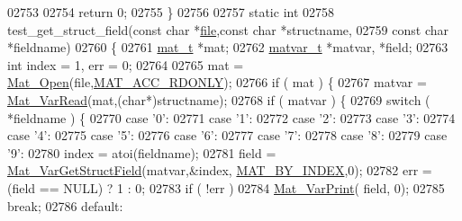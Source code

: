 \begin{DoxyCode}
{{{{{{{{02753 
02754     \textcolor{keywordflow}{return} 0;
02755 \}
02756 
02757 \textcolor{keyword}{static} \textcolor{keywordtype}{int}
02758 test\_get\_struct\_field(\textcolor{keyword}{const} \textcolor{keywordtype}{char} *\hyperlink{structfile}{file},\textcolor{keyword}{const} \textcolor{keywordtype}{char} *structname,
02759     \textcolor{keyword}{const} \textcolor{keywordtype}{char} *fieldname)
02760 \{
02761     \hyperlink{struct__mat__t}{mat\_t} *mat;
02762     \hyperlink{group___m_a_t_structmatvar__t}{matvar\_t} *matvar, *field;
02763     \textcolor{keywordtype}{int} index = 1, err = 0;
02764 
02765     mat = \hyperlink{group___m_a_t_gafbfedb5636a99f0ef867520c47f77d18}{Mat\_Open}(file,\hyperlink{group___m_a_t_ggaa9dcbc70f538af79bd557593ff6b5cdba8dd1457651b27ba9bea6cfba158c037c}{MAT\_ACC\_RDONLY});
02766     \textcolor{keywordflow}{if} ( mat ) \{
02767         matvar = \hyperlink{group___m_a_t_ga3505f63029763eaa73d5a19f1115eb42}{Mat\_VarRead}(mat,(\textcolor{keywordtype}{char}*)structname);
02768         \textcolor{keywordflow}{if} ( matvar ) \{
02769             \textcolor{keywordflow}{switch} ( *fieldname ) \{
02770                 \textcolor{keywordflow}{case} \textcolor{charliteral}{'0'}:
02771                 \textcolor{keywordflow}{case} \textcolor{charliteral}{'1'}:
02772                 \textcolor{keywordflow}{case} \textcolor{charliteral}{'2'}:
02773                 \textcolor{keywordflow}{case} \textcolor{charliteral}{'3'}:
02774                 \textcolor{keywordflow}{case} \textcolor{charliteral}{'4'}:
02775                 \textcolor{keywordflow}{case} \textcolor{charliteral}{'5'}:
02776                 \textcolor{keywordflow}{case} \textcolor{charliteral}{'6'}:
02777                 \textcolor{keywordflow}{case} \textcolor{charliteral}{'7'}:
02778                 \textcolor{keywordflow}{case} \textcolor{charliteral}{'8'}:
02779                 \textcolor{keywordflow}{case} \textcolor{charliteral}{'9'}:
02780                     index = atoi(fieldname);
02781                     field = \hyperlink{group___m_a_t_ga7018bfe6934b96ae32e8f2a1712eefab}{Mat\_VarGetStructField}(matvar,&index,
      \hyperlink{group___m_a_t_gga03158cf3a896ec3d4f306b5e920109b4a69c57994e272a363f56cb3ba888b047e}{MAT\_BY\_INDEX},0);
02782                     err = (field == NULL) ? 1 : 0;
02783                     \textcolor{keywordflow}{if} ( !err )
02784                         \hyperlink{group___m_a_t_ga9100c145e338b84b55d5d0795d5d390a}{Mat\_VarPrint}( field, 0);
02785                     \textcolor{keywordflow}{break};
02786                 \textcolor{keywordflow}{default}:
}}}}}}}}
\end{DoxyCode}
